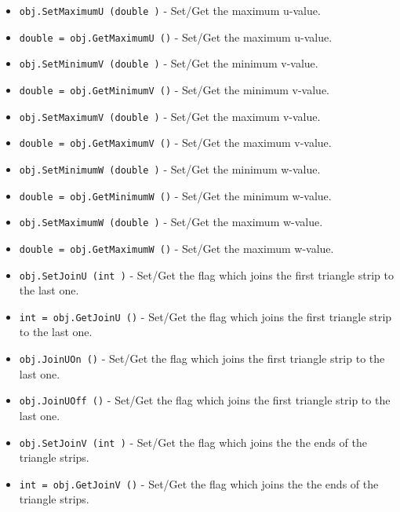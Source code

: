 \begin{itemize}
\item  \verb|obj.SetMaximumU (double )| -  Set/Get the maximum u-value.

\item  \verb|double = obj.GetMaximumU ()| -  Set/Get the maximum u-value.

\item  \verb|obj.SetMinimumV (double )| -  Set/Get the minimum v-value.

\item  \verb|double = obj.GetMinimumV ()| -  Set/Get the minimum v-value.

\item  \verb|obj.SetMaximumV (double )| -  Set/Get the maximum v-value.

\item  \verb|double = obj.GetMaximumV ()| -  Set/Get the maximum v-value.

\item  \verb|obj.SetMinimumW (double )| -  Set/Get the minimum w-value.

\item  \verb|double = obj.GetMinimumW ()| -  Set/Get the minimum w-value.

\item  \verb|obj.SetMaximumW (double )| -  Set/Get the maximum w-value.

\item  \verb|double = obj.GetMaximumW ()| -  Set/Get the maximum w-value.

\item  \verb|obj.SetJoinU (int )| -  Set/Get the flag which joins the first triangle strip to the last one.

\item  \verb|int = obj.GetJoinU ()| -  Set/Get the flag which joins the first triangle strip to the last one.

\item  \verb|obj.JoinUOn ()| -  Set/Get the flag which joins the first triangle strip to the last one.

\item  \verb|obj.JoinUOff ()| -  Set/Get the flag which joins the first triangle strip to the last one.

\item  \verb|obj.SetJoinV (int )| -  Set/Get the flag which joins the the ends of the triangle strips.

\item  \verb|int = obj.GetJoinV ()| -  Set/Get the flag which joins the the ends of the triangle strips.


\end{itemize}
